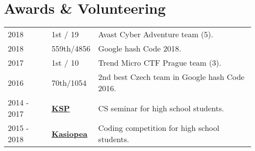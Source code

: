 \documentclass[a4paper]{deedy-resume} %
\begin{document}
\begin{minipage}[t]{0.62\textwidth}


\section{Awards \& Volunteering} 

\begin{tabular}{lll}
2018 & 1st / 19 & Avast Cyber Adventure team (5). \\
2018 & 559th/4856 & Google hash Code 2018. \\
2017 & 1st / 10 & Trend Micro CTF Prague team (3). \\
2016 & 70th/1054 & 2nd best Czech team in Google hash Code 2016. \\
2014 - 2017 & \href{https://ksp.mff.cuni.cz/}{\bf KSP} & CS seminar for high school students. \\
2015 - 2018 & \href{https://kasiopea.matfyz.cz/}{\bf Kasiopea} & Coding competition for high school students. \\
\end{tabular}

\sectionspace %



\sectionspace %


\end{minipage} %




\end{document}
